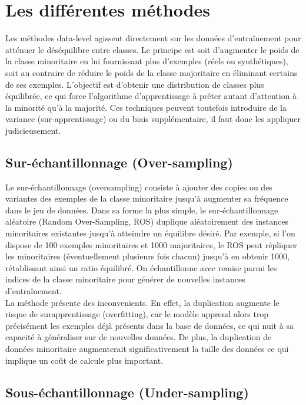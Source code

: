 \documentclass{article}
\begin{document}
\section{Les différentes méthodes}

Les méthodes data-level agissent directement sur les données d’entraînement pour atténuer le
déséquilibre entre classes. Le principe est soit d’augmenter le poids de la classe minoritaire en lui
fournissant plus d’exemples (réels ou synthétiques), soit au contraire de réduire le poids de la classe
majoritaire en éliminant certains de ses exemples. L’objectif est d’obtenir une distribution de classes
plus équilibrée, ce qui force l’algorithme d’apprentissage à prêter autant d’attention à la minorité qu’à la
majorité. Ces techniques peuvent toutefois introduire de la variance (sur-apprentissage) ou du
biais supplémentaire, il faut donc les appliquer judicieusement.

\subsection{Sur-échantillonnage (Over-sampling)}

Le sur-échantillonnage (oversampling) consiste à ajouter des copies ou des variantes des exemples de
la classe minoritaire jusqu’à augmenter sa fréquence dans le jeu de données. Dans sa forme la plus
simple, le sur-échantillonnage aléatoire (Random Over-Sampling, ROS) duplique aléatoirement des
instances minoritaires existantes jusqu’à atteindre un équilibre désiré. Par exemple, si l’on dispose
de 100 exemples minoritaires et 1000 majoritaires, le ROS peut répliquer les minoritaires
(éventuellement plusieurs fois chacun) jusqu’à en obtenir 1000, rétablissant ainsi un ratio équilibré. On échantillonne avec remise parmi les indices de la classe minoritaire pour
générer de nouvelles instances d’entraînement.
\\

La méthode présente des inconvenients. En effet, la duplication augmente le risque de surapprentissage (overfitting), car le modèle apprend alors trop précisément les exemples déjà présents dans la base de données, ce qui nuit à sa capacité à généraliser sur de nouvelles données.
De plus, la duplication de données minoritaire augmenterait significativement la taille des données ce qui implique un coût de calcule plus important.


\subsection{Sous-échantillonnage (Under-sampling)}
\end{document}
